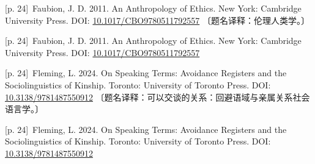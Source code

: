 \documentclass[10pt,a4paper]{article}
\begin{document}
\noindent\begin{minipage}{\textwidth}\begin{minipage}[t]{\dimexpr.5\textwidth-4mm\relax}\noindent\begin{minipage}[t]{\linewidth}{\scriptsize\color{gray} [p. 24]}\ Faubion, J. D. 2011. An Anthropology of Ethics. New York: Cambridge University Press. DOI: \url{10.1017/CBO9780511792557} 〔题名译释：伦理人类学。〕\par\end{minipage}\par\end{minipage}\hfill\begin{minipage}[t]{\dimexpr.5\textwidth-4mm\relax}\noindent\begin{minipage}[t]{\linewidth}{\scriptsize\color{gray} [p. 24]}\ Faubion, J. D. 2011. An Anthropology of Ethics. New York: Cambridge University Press. DOI: \url{10.1017/CBO9780511792557}\par\end{minipage}\par\end{minipage}\end{minipage}\par
\noindent\begin{minipage}{\textwidth}\begin{minipage}[t]{\dimexpr.5\textwidth-4mm\relax}\noindent\begin{minipage}[t]{\linewidth}{\scriptsize\color{gray} [p. 24]}\ Fleming, L. 2024. On Speaking Terms: Avoidance Registers and the Sociolinguistics of Kinship. Toronto: University of Toronto Press. DOI: \url{10.3138/9781487550912} 〔题名译释：可以交谈的关系：回避语域与亲属关系社会语言学。〕\par\end{minipage}\par\end{minipage}\hfill\begin{minipage}[t]{\dimexpr.5\textwidth-4mm\relax}\noindent\begin{minipage}[t]{\linewidth}{\scriptsize\color{gray} [p. 24]}\ Fleming, L. 2024. On Speaking Terms: Avoidance Registers and the Sociolinguistics of Kinship. Toronto: University of Toronto Press. DOI: \url{10.3138/9781487550912}\par\end{minipage}\par\end{minipage}\end{minipage}\par
\end{document}
